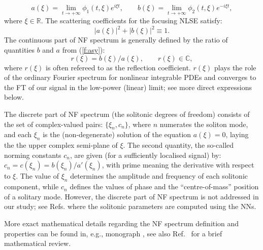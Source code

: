 \begin{equation}
a(\xi)=\lim_{t\rightarrow+\infty}\phi_1(t,\xi) e^{i\xi t},
\qquad b(\xi)=\lim_{t \rightarrow+\infty}\phi_2(t,\xi) e^{-i\xi t},
\label{f:ab}
\end{equation}
where $\xi \in \mathbb{R}$. The scattering coefficients for the focusing NLSE satisfy:
\begin{equation}\label{norm}
|a(\xi)|^2 + |b(\xi)|^2 \equiv 1.
\end{equation}
The continuous part of NF spectrum is generally defined by the ratio of quantities $b$ and $a$ from (\ref{f:asy}):
\begin{equation}
\label{r}
r(\xi)=b(\xi)/a(\xi), \qquad r(\xi) \in \mathbb{C},
\end{equation}
where $r(\xi)$ is often refereed to as the reflection coefficient. $r(\xi)$  plays the role of the ordinary Fourier spectrum for nonlinear integrable PDEs and converges to the FT of our signal in the low-power (linear) limit; see more direct expressions below. 

The discrete part of NF spectrum (the solitonic degrees of freedom) consists of the set of complex-valued pairs: $\{ \xi_n, c_n\}$, where $n$ numerates the soliton mode, and each $\xi_n$ is the (non-degenerate) solution of the equation $a(\xi)=0$, laying the the upper complex semi-plane of $\xi$. The second quantity, the so-called norming constants $c_n$, are given (for a sufficiently localised signal\cite{vps19}) by: $c_n = c(\xi_n) = b(\xi_n)/a'(\xi_n)$, with prime meaning the derivative with respect to $\xi$. The value of $\xi_n$ determines the amplitude and frequency of each solitonic component, while $c_n$ defines the values of phase and the ``centre-of-mass''  position of a solitary mode. However, the discrete part of NF spectrum is not addressed in our study; see Refs.\cite{jgy18,ymm19,wxz20} where the solitonic parameters are computed using the NNs. 

More exact mathematical details regarding the NF spectrum definition and properties can be found in, e.g., monograph \cite{nmp84}, see also Ref.~\cite{vps19} for a brief mathematical review. 

